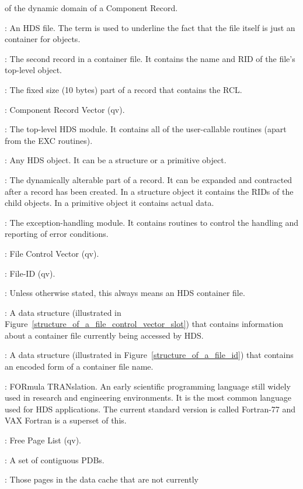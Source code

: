 \begin {description}
of the dynamic domain of a Component Record.
\item [Container File]: An HDS file. The term is used to underline the fact
that the file itself is just an container for objects.
\item [Container Record]: The second record in a container file. It contains
the name and RID of the file's top-level object.
\item [Control Domain]: The fixed size (10 bytes) part of a record that
contains the RCL.
\item [CRV]: Component Record Vector (qv).
\item [DAT]: The top-level HDS module. It contains all of the user-callable
routines (apart from the EXC routines).
\item [Data Object]: Any HDS object. It can be a structure or a primitive
object.
\item [Dynamic Domain]: The dynamically alterable part of a record. It can
be expanded and contracted after a record has been created. In a structure
object it contains the RIDs of the child objects. In a primitive object it
contains actual data.
\item [EXC]: The exception-handling module. It contains routines to control
the handling and reporting of error conditions.
\item [FCV]: File Control Vector (qv).
\item [FID]: File-ID (qv).
\item [File]: Unless otherwise stated, this always means an HDS container file.
\item [File Control Vector]: A data structure (illustrated in
Figure~\ref{structure_of_a_file_control_vector_slot}) that contains information
about a container file currently being accessed by HDS.
\item [File-ID]: A data structure (illustrated in
Figure~\ref{structure_of_a_file_id}) that contains an encoded form of a
container file name.
\item [FORTRAN]: FORmula TRANslation. An early scientific programming language
still widely used in research and engineering environments. It is the most
common language used for HDS applications. The current standard version is
called Fortran-77 and VAX Fortran is a superset of this.
\item [FPL]: Free Page List (qv).
\item [Frame]: A set of contiguous PDBs.
\item [Free Page List]: Those pages in the data cache that are not currently

\end{description}
